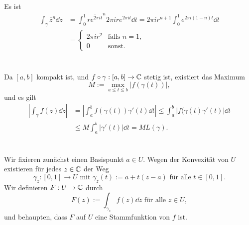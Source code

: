 \documentclass[a4paper,10pt]{article}
\begin{document}
\subsection{}
Es ist
\begin{align*}
 \int_\gamma \overline{z}^n \dd{z}
 &= \int_0^1 \overline{r e^{2\pi i t}}^n 2\pi i r e^{2\pi i t} \dd{t}
 = 2\pi i r^{n+1} \int_0^1 e^{2\pi i (1-n) t} \dd{t} \\
 &= \begin{cases} 2\pi i r^2 & \text{falls } n=1, \\ 0 & \text{sonst}. \end{cases}
\end{align*}


\subsection{}





\addtocounter{section}{1}





\section{}
Da $[a,b]$ kompakt ist, und $f \circ \gamma : [a,b] \to \mathbb{C}$ stetig ist, existiert das Maximum
\[
 M := \max_{a \leq t \leq b} |f(\gamma(t))|,
\]
und es gilt
\begin{align*}
 \left| \int_\gamma f(z) \dd{z} \right|
 &= \left| \int_a^b f(\gamma(t)) \gamma'(t) \dd{t} \right|
 \leq \int_a^b |f(\gamma(t) \gamma'(t) | \dd{t} \\
 &\leq M \int_a^b |\gamma'(t)| \dd{t}
 = M L(\gamma).
\end{align*}





\section{}
Wir fixieren zunächst einen Basispunkt $a \in U$. Wegen der Konvexität von $U$ existieren für jedes $z \in \mathbb{C}$ der Weg
\[
 \gamma_z : [0,1] \to U \text{ mit } \gamma_z(t) := a + t(z-a) \text{ für alle } t \in [0,1].
\]
Wir definieren $F : U \to \mathbb{C}$ durch
\[
 F(z) := \int_{\gamma_z} f(z) \dd{z} \text{ für alle } z \in U,
\]
und behaupten, dass $F$ auf $U$ eine Stammfunktion von $f$ ist.
\end{document}
